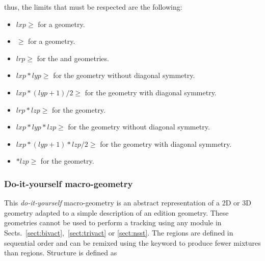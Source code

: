 \noindent
thus, the limits that must be respected are the following:

\begin{itemize}

\item $lxp\ge$ for a  geometry.

\item {}$\ge$ for a  geometry.

\item $lrp\ge$ for the  and  geometries.

\item $lxp*lyp\ge$ for the  geometry without diagonal symmetry. 

\item $lxp*(lyp+1)/2\ge$ for the  geometry with diagonal symmetry. 

\item $lrp*lzp\ge$ for the  geometry.

\item $lxp*lyp*lzp\ge$ for the  geometry without diagonal symmetry. 

\item $lxp*(lyp+1)*lzp/2\ge$ for the  geometry with diagonal symmetry. 

\item {}$*lzp\ge$ for the  geometry.

\end{itemize}

\subsubsection{Do-it-yourself macro-geometry}\label{sect:descMACRO}

This {\sl do-it-yourself} macro-geometry is an abstract representation of a 2D or 3D geometry adapted to a simple description of an edition geometry. These geometries cannot be used to perform a tracking using any module in Sects.~\ref{sect:bivact},~\ref{sect:trivact} or \ref{sect:nsst}. The  regions are defined in sequential order and can be remixed using the  keyword to produce fewer mixtures than regions. Structure  is defined as

